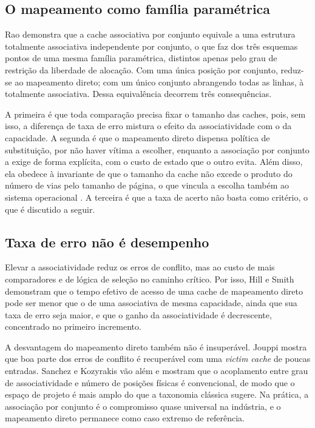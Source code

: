 \documentclass[12pt]{article}
\begin{document}
\subsection{O mapeamento como família paramétrica}

Rao \cite{rao1978} demonstra que a cache associativa por conjunto equivale a
uma estrutura totalmente associativa independente por conjunto, o que
faz dos três esquemas pontos de uma mesma família paramétrica, distintos
apenas pelo grau de restrição da liberdade de alocação. Com uma única
posição por conjunto, reduz-se ao mapeamento direto; com um único
conjunto abrangendo todas as linhas, à totalmente associativa. Dessa
equivalência decorrem três consequências.

A primeira é que toda comparação precisa fixar o tamanho das caches,
pois, sem isso, a diferença de taxa de erro mistura o efeito da
associatividade com o da capacidade. A segunda é que o mapeamento direto
dispensa política de substituição, por não haver vítima a escolher,
enquanto a associação por conjunto a exige de forma explícita, com o
custo de estado que o outro evita. Além disso, ela obedece à invariante
de que o tamanho da cache não excede o produto do número de vias pelo
tamanho de página, o que vincula a escolha também ao sistema operacional
\cite{hill1988}. A terceira é que a taxa de acerto não basta como critério,
o que é discutido a seguir.

\subsection{Taxa de erro não é desempenho}

Elevar a associatividade reduz os erros de conflito, mas ao custo de mais
comparadores e de lógica de seleção no caminho crítico. Por isso, Hill e
Smith \cite{hill1989} demonstram que o tempo efetivo de acesso de uma cache de
mapeamento direto pode ser menor que o de uma associativa de mesma
capacidade, ainda que sua taxa de erro seja maior, e que o ganho da
associatividade é decrescente, concentrado no primeiro incremento.

A desvantagem do mapeamento direto também não é insuperável. Jouppi
\cite{jouppi1990} mostra que boa parte dos erros de conflito é recuperável com uma
\textit{victim cache} de poucas entradas. Sanchez e Kozyrakis \cite{sanchez2010}
vão além e mostram que o acoplamento entre grau de associatividade e
número de posições físicas é convencional, de modo que o espaço de
projeto é mais amplo do que a taxonomia clássica sugere. Na prática, a
associação por conjunto é o compromisso quase universal na indústria,
e o mapeamento direto permanece como caso extremo de referência.
\end{document}
